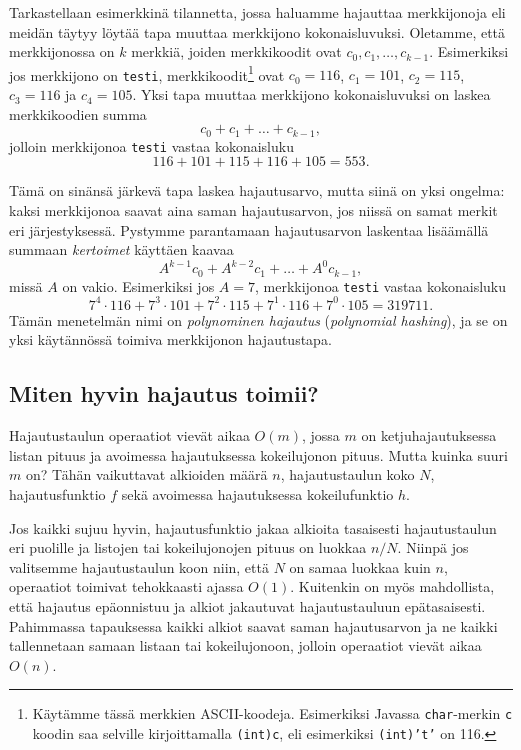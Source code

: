 Tarkastellaan esimerkkinä tilannetta, jossa haluamme hajauttaa merkkijonoja
eli mei\-dän täytyy löytää tapa muuttaa merkkijono kokonaisluvuksi.
Oletamme, että merkkijonossa on $k$ merkkiä,
joiden merkkikoodit ovat $c_0,c_1,\dots,c_{k-1}$.
Esimerkiksi jos merkkijono on \texttt{testi},
merkkikoodit\footnote{Käytämme tässä merkkien ASCII-koodeja.
Esimerkiksi Javassa \texttt{char}-merkin \texttt{c} koodin saa
selville kirjoittamalla \texttt{(int)c}, eli esimerkiksi
\texttt{(int)'t'} on 116.} ovat $c_0=116$, $c_1=101$, $c_2=115$,
$c_3=116$ ja $c_4=105$.
Yksi tapa muuttaa merkkijono kokonaisluvuksi
on laskea merkkikoodien summa
\[ c_0 + c_1 + \dots + c_{k-1},\]
jolloin merkkijonoa \texttt{testi} vastaa kokonaisluku
\[116+101+115+116+105=553.\]


Tämä on sinänsä järkevä tapa laskea hajautusarvo, mutta siinä on yksi ongelma:
kaksi merkkijonoa saavat aina saman hajautusarvon,
jos niissä on samat merkit eri järjestyksessä.
Pystymme parantamaan hajautusarvon laskentaa lisäämällä
summaan \emph{kertoimet} käyttäen kaavaa
\[ A^{k-1} c_0 + A^{k-2} c_1 + \dots + A^0 c_{k-1},\]
missä $A$ on vakio.
Esimerkiksi jos $A=7$, merkkijonoa \texttt{testi} vastaa kokonaisluku
\[7^4 \cdot 116+7^3 \cdot 101+7^2 \cdot 115+7^1 \cdot 116+7^0 \cdot 105=319711.\]
Tämän menetelmän nimi on \emph{polynominen hajautus}
(\emph{polynomial hashing}),
ja se on yksi käytännössä toimiva merkkijonon hajautustapa.

\subsection{Miten hyvin hajautus toimii?}

Hajautustaulun operaatiot vievät aikaa $O(m)$,
jossa $m$ on ketjuhajautuksessa listan pituus
ja avoimessa hajautuksessa kokeilujonon pituus.
Mutta kuinka suuri $m$ on? Tähän vaikuttavat
alkioiden määrä $n$, hajautustaulun koko $N$,
hajautusfunktio $f$ sekä avoimessa hajautuksessa
kokeilufunktio $h$.

Jos kaikki sujuu hyvin, hajautusfunktio jakaa alkioita
tasaisesti hajautustaulun eri puolille
ja listojen tai kokeilujonojen pituus on luokkaa $n/N$.
Niinpä jos valitsemme hajautustaulun koon niin,
että $N$ on samaa luokkaa kuin $n$,
operaatiot toimivat tehokkaasti ajassa $O(1)$.
Kuitenkin on myös mahdollista, että hajautus epäonnistuu
ja alkiot jakautuvat hajautustauluun epätasaisesti.
Pahimmassa tapauksessa kaikki alkiot saavat saman
hajautusarvon ja ne kaikki tallennetaan samaan listaan
tai kokeilujonoon, jolloin operaatiot vievät aikaa $O(n)$.

